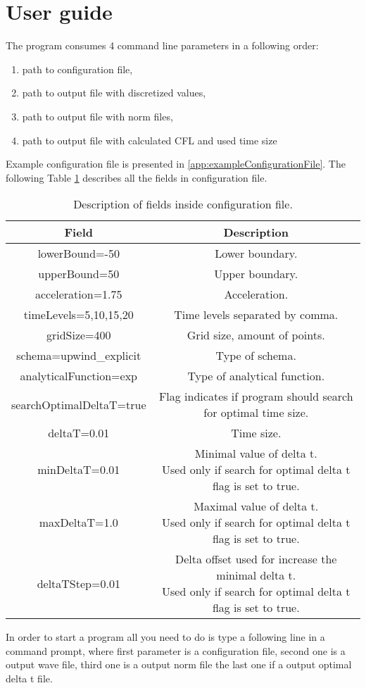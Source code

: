 \section{User guide}
	The program consumes 4 command line parameters in a following order:
	\begin{enumerate}
		\item path to configuration file,
		\item path to output file with discretized values,
		\item path to output file with norm files,
		\item path to output file with calculated CFL and used time size
	\end{enumerate}
	Example configuration file is presented in \ref{app:exampleConfigurationFile}. The following Table \ref{tab:ugConf} describes all the fields in configuration file.	
	\begin{table}[!htbp]
		\caption{Description of fields inside configuration file.}
		\label{tab:ugConf}
		\centering
		\begin{tabular}{|c|c|}
			\hline
			\textbf{Field} & \textbf{Description} \\ \hline \hline
			lowerBound=-50 & Lower boundary. \\ \hline
			upperBound=50 & Upper boundary. \\ \hline
			acceleration=1.75 & Acceleration. \\ \hline
			timeLevels=5,10,15,20 & Time levels separated by comma. \\ \hline
			gridSize=400 & Grid size, amount of points. \\ \hline
			schema=upwind\_explicit & Type of schema. \\ \hline
			analyticalFunction=exp & Type of analytical function. \\ \hline
			searchOptimalDeltaT=true & \shortstack{Flag indicates if program should search \\ for optimal time size.} \\ \hline
			deltaT=0.01 & Time size. \\ \hline
			minDeltaT=0.01 & \shortstack{Minimal value of delta t. \\ Used only if search for optimal delta t flag is set to true.} \\ \hline
			maxDeltaT=1.0 & \shortstack{Maximal value of delta t. \\ Used only if search for optimal delta t flag is set to true.} \\ \hline
			deltaTStep=0.01 & \shortstack{Delta offset used for increase the minimal delta t.  \\Used only if search for optimal delta t flag is set to true.} \\ \hline
		\end{tabular}
	\end{table}
	In order to start a program all you need to do is type a following line in a command prompt, where first parameter is a configuration file, second one is a output wave file, third one is a output norm file the last one if a output optimal delta t file.
	
